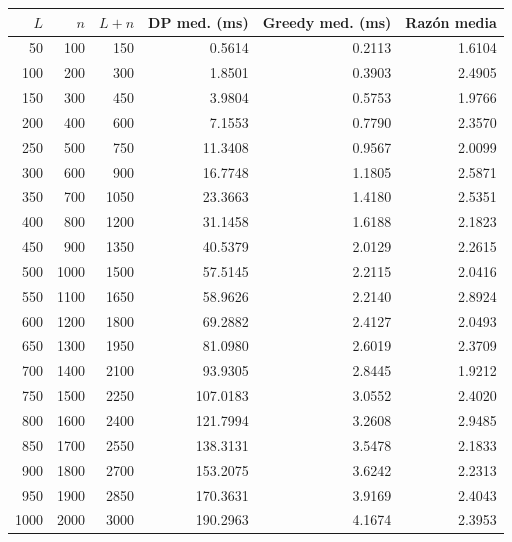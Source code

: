 \newcommand{\DPPolynomial}{\ensuremath{1.96675e-05x^2 + 0.00457277x - 1.77819}}
\newcommand{\GreedyPolynomial}{\ensuremath{0.00137928x - 0.0223805}}
\newcommand{\DPDegree}{2}
\newcommand{\GreedyDegree}{1}
\newcommand{\DPRSquared}{0.9988}
\newcommand{\GreedyRSquared}{0.9970}
\newcommand{\DPAdjRSquared}{0.9987}
\newcommand{\GreedyAdjRSquared}{0.9968}
\newcommand{\DPRMSE}{2.0364}
\newcommand{\GreedyRMSE}{0.0655}
\newcommand{\MeanApproxRatio}{2.2925}
\newcommand{\WorstApproxRatio}{8.4000}

\begin{tabular}{rrrrrr}
\toprule
$L$ & $n$ & $L+n$ & DP med. (ms) & Greedy med. (ms) & Raz\'on media \\
\midrule
50 & 100 & 150 & 0.5614 & 0.2113 & 1.6104 \\
100 & 200 & 300 & 1.8501 & 0.3903 & 2.4905 \\
150 & 300 & 450 & 3.9804 & 0.5753 & 1.9766 \\
200 & 400 & 600 & 7.1553 & 0.7790 & 2.3570 \\
250 & 500 & 750 & 11.3408 & 0.9567 & 2.0099 \\
300 & 600 & 900 & 16.7748 & 1.1805 & 2.5871 \\
350 & 700 & 1050 & 23.3663 & 1.4180 & 2.5351 \\
400 & 800 & 1200 & 31.1458 & 1.6188 & 2.1823 \\
450 & 900 & 1350 & 40.5379 & 2.0129 & 2.2615 \\
500 & 1000 & 1500 & 57.5145 & 2.2115 & 2.0416 \\
550 & 1100 & 1650 & 58.9626 & 2.2140 & 2.8924 \\
600 & 1200 & 1800 & 69.2882 & 2.4127 & 2.0493 \\
650 & 1300 & 1950 & 81.0980 & 2.6019 & 2.3709 \\
700 & 1400 & 2100 & 93.9305 & 2.8445 & 1.9212 \\
750 & 1500 & 2250 & 107.0183 & 3.0552 & 2.4020 \\
800 & 1600 & 2400 & 121.7994 & 3.2608 & 2.9485 \\
850 & 1700 & 2550 & 138.3131 & 3.5478 & 2.1833 \\
900 & 1800 & 2700 & 153.2075 & 3.6242 & 2.2313 \\
950 & 1900 & 2850 & 170.3631 & 3.9169 & 2.4043 \\
1000 & 2000 & 3000 & 190.2963 & 4.1674 & 2.3953 \\
\bottomrule
\end{tabular}

